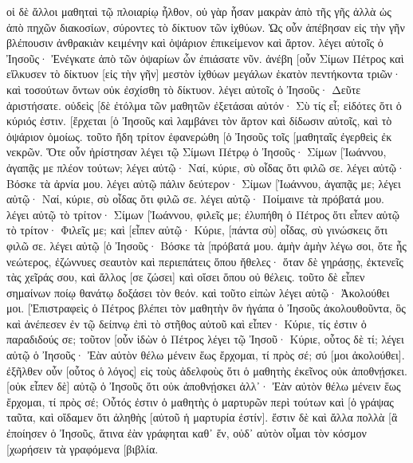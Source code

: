 οἱ δὲ ἄλλοι μαθηταὶ τῷ πλοιαρίῳ ἦλθον, οὐ γὰρ ἦσαν μακρὰν ἀπὸ τῆς γῆς ἀλλὰ ὡς ἀπὸ πηχῶν διακοσίων, σύροντες τὸ δίκτυον τῶν ἰχθύων. 
Ὡς οὖν ἀπέβησαν εἰς τὴν γῆν βλέπουσιν ἀνθρακιὰν κειμένην καὶ ὀψάριον ἐπικείμενον καὶ ἄρτον. 
λέγει αὐτοῖς ὁ Ἰησοῦς· Ἐνέγκατε ἀπὸ τῶν ὀψαρίων ὧν ἐπιάσατε νῦν. 
ἀνέβη [οὖν Σίμων Πέτρος καὶ εἵλκυσεν τὸ δίκτυον [εἰς τὴν γῆν] μεστὸν ἰχθύων μεγάλων ἑκατὸν πεντήκοντα τριῶν· καὶ τοσούτων ὄντων οὐκ ἐσχίσθη τὸ δίκτυον. 
λέγει αὐτοῖς ὁ Ἰησοῦς· Δεῦτε ἀριστήσατε. οὐδεὶς [δὲ ἐτόλμα τῶν μαθητῶν ἐξετάσαι αὐτόν· Σὺ τίς εἶ; εἰδότες ὅτι ὁ κύριός ἐστιν. 
[ἔρχεται [ὁ Ἰησοῦς καὶ λαμβάνει τὸν ἄρτον καὶ δίδωσιν αὐτοῖς, καὶ τὸ ὀψάριον ὁμοίως. 
τοῦτο ἤδη τρίτον ἐφανερώθη [ὁ Ἰησοῦς τοῖς [μαθηταῖς ἐγερθεὶς ἐκ νεκρῶν. 
Ὅτε οὖν ἠρίστησαν λέγει τῷ Σίμωνι Πέτρῳ ὁ Ἰησοῦς· Σίμων [Ἰωάννου, ἀγαπᾷς με πλέον τούτων; λέγει αὐτῷ· Ναί, κύριε, σὺ οἶδας ὅτι φιλῶ σε. λέγει αὐτῷ· Βόσκε τὰ ἀρνία μου. 
λέγει αὐτῷ πάλιν δεύτερον· Σίμων [Ἰωάννου, ἀγαπᾷς με; λέγει αὐτῷ· Ναί, κύριε, σὺ οἶδας ὅτι φιλῶ σε. λέγει αὐτῷ· Ποίμαινε τὰ πρόβατά μου. 
λέγει αὐτῷ τὸ τρίτον· Σίμων [Ἰωάννου, φιλεῖς με; ἐλυπήθη ὁ Πέτρος ὅτι εἶπεν αὐτῷ τὸ τρίτον· Φιλεῖς με; καὶ [εἶπεν αὐτῷ· Κύριε, [πάντα σὺ] οἶδας, σὺ γινώσκεις ὅτι φιλῶ σε. λέγει αὐτῷ [ὁ Ἰησοῦς· Βόσκε τὰ [πρόβατά μου. 
ἀμὴν ἀμὴν λέγω σοι, ὅτε ἦς νεώτερος, ἐζώννυες σεαυτὸν καὶ περιεπάτεις ὅπου ἤθελες· ὅταν δὲ γηράσῃς, ἐκτενεῖς τὰς χεῖράς σου, καὶ ἄλλος [σε ζώσει] καὶ οἴσει ὅπου οὐ θέλεις. 
τοῦτο δὲ εἶπεν σημαίνων ποίῳ θανάτῳ δοξάσει τὸν θεόν. καὶ τοῦτο εἰπὼν λέγει αὐτῷ· Ἀκολούθει μοι. 
[Ἐπιστραφεὶς ὁ Πέτρος βλέπει τὸν μαθητὴν ὃν ἠγάπα ὁ Ἰησοῦς ἀκολουθοῦντα, ὃς καὶ ἀνέπεσεν ἐν τῷ δείπνῳ ἐπὶ τὸ στῆθος αὐτοῦ καὶ εἶπεν· Κύριε, τίς ἐστιν ὁ παραδιδούς σε; 
τοῦτον [οὖν ἰδὼν ὁ Πέτρος λέγει τῷ Ἰησοῦ· Κύριε, οὗτος δὲ τί; 
λέγει αὐτῷ ὁ Ἰησοῦς· Ἐὰν αὐτὸν θέλω μένειν ἕως ἔρχομαι, τί πρὸς σέ; σύ [μοι ἀκολούθει]. 
ἐξῆλθεν οὖν [οὗτος ὁ λόγος] εἰς τοὺς ἀδελφοὺς ὅτι ὁ μαθητὴς ἐκεῖνος οὐκ ἀποθνῄσκει. [οὐκ εἶπεν δὲ] αὐτῷ ὁ Ἰησοῦς ὅτι οὐκ ἀποθνῄσκει ἀλλ᾽· Ἐὰν αὐτὸν θέλω μένειν ἕως ἔρχομαι, τί πρὸς σέ; 
Οὗτός ἐστιν ὁ μαθητὴς ὁ μαρτυρῶν περὶ τούτων καὶ [ὁ γράψας ταῦτα, καὶ οἴδαμεν ὅτι ἀληθὴς [αὐτοῦ ἡ μαρτυρία ἐστίν]. 
ἔστιν δὲ καὶ ἄλλα πολλὰ [ἃ ἐποίησεν ὁ Ἰησοῦς, ἅτινα ἐὰν γράφηται καθ᾽ ἕν, οὐδ᾽ αὐτὸν οἶμαι τὸν κόσμον [χωρήσειν τὰ γραφόμενα [βιβλία. 
